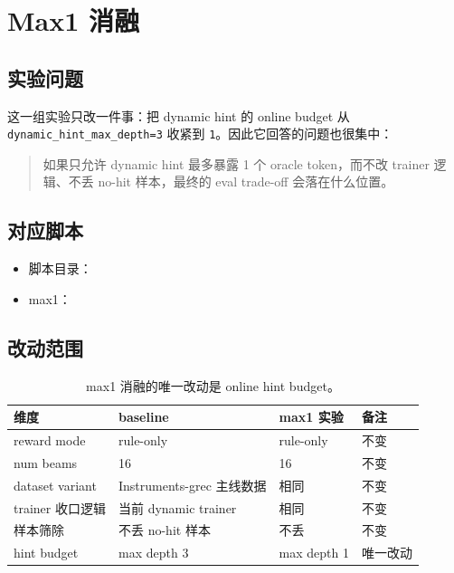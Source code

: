 \section{Max1 消融}

\subsection{实验问题}

这一组实验只改一件事：把 dynamic hint 的 online budget 从 \texttt{dynamic\_hint\_max\_depth=3} 收紧到 \texttt{1}。因此它回答的问题也很集中：

\begin{quote}
如果只允许 dynamic hint 最多暴露 1 个 oracle token，而不改 trainer 逻辑、不丢 no-hit 样本，最终的 eval trade-off 会落在什么位置。
\end{quote}

\subsection{对应脚本}

{\footnotesize
\begin{itemize}
\item 脚本目录：
\item max1：
\end{itemize}
}

\subsection{改动范围}

\begin{table}[H]
\centering
\small
\begin{tabularx}{\textwidth}{l l l Y}
\toprule
维度 & baseline & max1 实验 & 备注 \\
\midrule
reward mode & rule-only & rule-only & 不变 \\
num beams & 16 & 16 & 不变 \\
dataset variant & Instruments-grec 主线数据 & 相同 & 不变 \\
trainer 收口逻辑 & 当前 dynamic trainer & 相同 & 不变 \\
样本筛除 & 不丢 no-hit 样本 & 不丢 & 不变 \\
hint budget & max depth 3 & max depth 1 & 唯一改动 \\
\bottomrule
\end{tabularx}
\caption{max1 消融的唯一改动是 online hint budget。}
\end{table}

